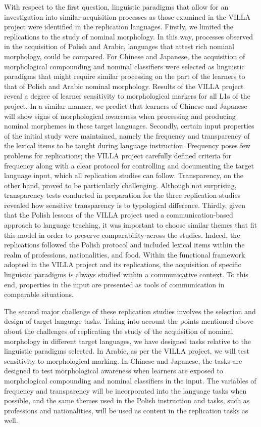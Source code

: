 \documentclass[output=paper,colorlinks,citecolor=brown,modfonts,nonflat]{../langscibook}
\begin{document}
With respect to the first question, linguistic paradigms that allow for an investigation into similar acquisition processes as those examined in the VILLA project were identified in the replication languages. Firstly, we limited the replications to the study of nominal morphology. In this way, processes observed in the acquisition of Polish and Arabic, languages that attest rich nominal morphology, could be compared. For Chinese and Japanese, the acquisition of morphological compounding and nominal classifiers were selected as linguistic paradigms that might require similar processing on the part of the learners to that of Polish and Arabic nominal morphology. Results of the VILLA project reveal a degree of learner sensitivity to morphological markers for all L1s of the project.  In a similar manner, we predict that learners of Chinese and Japanese will show signs of morphological awareness when processing and producing nominal morphemes in these target languages. Secondly, certain input properties of the initial study were maintained, namely the frequency and transparency of the lexical items to be taught during language instruction. Frequency poses few problems for replications; the VILLA project carefully defined criteria for frequency along with a clear protocol for controlling and documenting the target language input, which all replication studies can follow. Transparency, on the other hand, proved to be particularly challenging. Although not surprising, transparency tests conducted in preparation for the three replication studies revealed how sensitive transparency is to typological difference. Thirdly, given that the Polish lessons of the VILLA project used a communication-based approach to language teaching, it was important to choose similar themes that fit this model in order to preserve comparability across the studies. Indeed, the replications followed the Polish protocol and included lexical items within the realm of professions, nationalities, and food. Within the functional framework adopted in the VILLA project and its replications, the acquisition of specific linguistic paradigms is always studied within a communicative context. To this end, properties in the input are presented as tools of communication in comparable situations.

The second major challenge of these replication studies involves the selection and design of target language tasks. Taking into account the points mentioned above about the challenges of replicating the study of the acquisition of nominal morphology in different target languages, we have designed tasks relative to the linguistic paradigms selected. In Arabic, as per the VILLA project, we will test sensitivity to morphological marking. In Chinese and Japanese, the tasks are designed to test morphological awareness when learners are exposed to morphological compounding and nominal classifiers in the input. The variables of frequency and transparency will be incorporated into the language tasks when possible, and the same themes used in the Polish instruction and tasks, such as professions and nationalities, will be used as content in the replication tasks as well.
\end{document}
